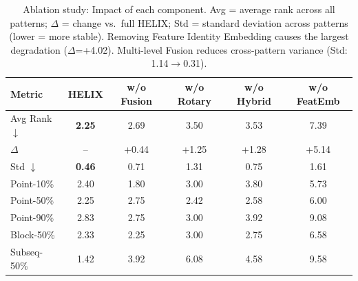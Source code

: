 \begin{table}[t]
    \caption{Ablation study: Impact of each component. Avg = average rank across all patterns; $\Delta$ = change vs.\ full HELIX; Std = standard deviation across patterns (lower = more stable). Removing Feature Identity Embedding causes the largest degradation ($\Delta$=+4.02). Multi-level Fusion reduces cross-pattern variance (Std: 1.14$\to$0.31).}
    \label{tab:ablation}
    \centering
    \begin{small}
    \begin{tabular}{l|ccccc}
        \toprule
        \textbf{Metric} & \textbf{HELIX} & \textbf{w/o Fusion} & \textbf{w/o Rotary} & \textbf{w/o Hybrid} & \textbf{w/o FeatEmb} \\
        \midrule
        Avg Rank $\downarrow$ & \textbf{2.25} & 2.69 & 3.50 & 3.53 & 7.39 \\
        $\Delta$ & -- & +0.44 & +1.25 & +1.28 & +5.14 \\
        Std $\downarrow$ & \textbf{0.46} & 0.71 & 1.31 & 0.75 & 1.61 \\
        \midrule
        Point-10\% & 2.40 & 1.80 & 3.00 & 3.80 & 5.73 \\
        Point-50\% & 2.25 & 2.75 & 2.42 & 2.58 & 6.00 \\
        Point-90\% & 2.83 & 2.75 & 3.00 & 3.92 & 9.08 \\
        Block-50\% & 2.33 & 2.25 & 3.00 & 2.75 & 6.58 \\
        Subseq-50\% & 1.42 & 3.92 & 6.08 & 4.58 & 9.58 \\
        \bottomrule
    \end{tabular}
    \end{small}
\end{table}